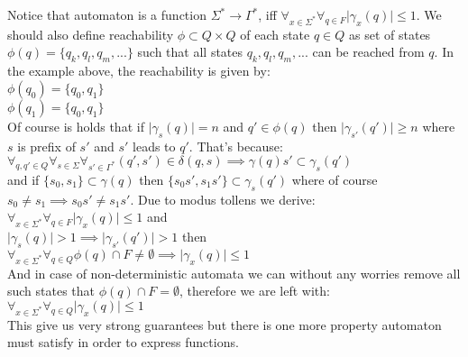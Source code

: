 \documentclass[12pt]{article}
\begin{document}
\begin{enumerate}
\begin{center}
\end{center}


Notice that automaton is a function $\Sigma^* \rightarrow \Gamma^*$, iff $\forall_{x\in\Sigma^*} \forall_{q\in F} \vert \gamma_x(q) \vert \le 1$. We should also define reachability $\phi \subset Q \times Q$ of each state $q\in Q$ as set of states $\phi(q) = \{q_k,q_l,q_m,...\}$ such that all states $q_k,q_l,q_m,...$ can be reached from $q$. In the example above, the reachability is given by: \\
$\phi(q_0) = \{q_0,q_1\}$ \\
$\phi(q_1) = \{q_0,q_1\}$ \\
Of course is holds that if $\vert \gamma_s(q) \vert = n$ and $q' \in \phi(q)$ then $\vert \gamma_{s'}(q') \vert \ge n$ where $s$ is prefix of $s'$ and $s'$ leads to $q'$. That's because: \\
$\forall_{q,q'\in Q} \forall_{s\in\Sigma} \forall_{s' \in \Gamma^*} (q',s') \in \delta(q,s) \implies  \gamma(q)s' \subset \gamma_{s}(q')$  \\
and if $\{s_0,s_1\} \subset\gamma(q)$ then $\{s_0s',s_1s'\} \subset\gamma_s(q')$ where of course $s_0 \ne s_1 \implies s_0s' \ne s_1s'$. Due to modus tollens we derive: \\ 
$\forall_{x\in\Sigma^*} \forall_{q\in F} \vert \gamma_x(q) \vert \le 1$ and \\
$\vert \gamma_s(q) \vert > 1 \implies \vert \gamma_{s'}(q') \vert  > 1$ then \\ $\forall_{x\in\Sigma^*} \forall_{q\in Q} \phi(q) \cap F \ne \emptyset \implies  \vert \gamma_x(q) \vert \le 1$ \\
And in case of non-deterministic automata we can without any worries remove all such states that $ \phi(q) \cap F = \emptyset$, therefore we are left with: \\
$\forall_{x\in\Sigma^*} \forall_{q\in Q} \vert \gamma_x(q) \vert \le 1$ \\
This give us very strong guarantees but there is one more property automaton must satisfy in order to express functions.



\end{enumerate}
\end{document}
